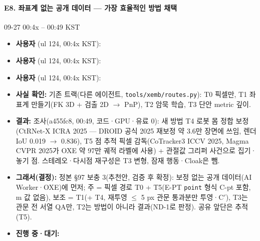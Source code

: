 \paragraph{E8. 좌표계 없는 공개 데이터 --- 가장 효율적인 방법 채택}
{\small 09-27 00:4x -- 00:49 KST}
\begin{itemize}
  \item \textbf{사용자} (ul 124, 00:4x KST): 
  \item \textbf{사용자} (ul 124, 00:4x KST): 
  \item \textbf{사용자} (ul 124, 00:4x KST): 
  \item \textbf{사실 확인:} 기존 트랙(다른 에이전트, \texttt{tools/\allowbreak{}xemb/\allowbreak{}routes.\allowbreak{}py}): T0 픽셀만, T1 좌표계 만들기(FK 3D + 검출 2D $\rightarrow$ PnP), T2 암묵 학습, T3 단안 metric 깊이.
  \item \textbf{결과:} 조사(a455fc8, 00:49, 코드·GPU·유료 0): 새 방법 T4 로봇 몸 정합 보정(CtRNet-X ICRA 2025 --- DROID 공식 2025 재보정 약 3.6만 장면에 쓰임, 렌더 IoU 0.019 $\rightarrow$ 0.836), T5 점 추적 픽셀 감독(CoTracker3 ICCV 2025, Magma CVPR 2025가 OXE 약 97만 궤적 라벨에 사용) + 관절값 그리퍼 사건으로 집기·놓기 점. 스테레오·다시점 재구성은 T3 변형, 잠재 행동·Cloak은 뺌.
  \item \textbf{그래서(결정):} 정본 §97 보충 3(추천안, 검증 후 확정): 보정 없는 공개 데이터(AI Worker·OXE)에 먼저; 주 = 픽셀 경로 T0 + T5(E-PT \texttt{point} 형식 C-pt 포함, m 값 없음), 보조 = T1(+ T4, 재투영 $\leq$ 5 px 관문 통과분만 투영·C$'$), T3는 관문 전 서열 QA만, T2는 방법이 아니라 결과(ND-1로 판정). 공유 앞단은 추적(T5).
  \item \textbf{진행 중·대기:} 
\end{itemize}

